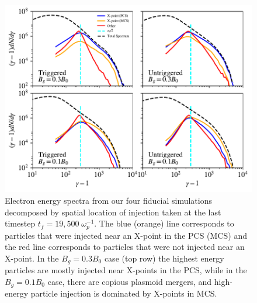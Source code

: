 \begin{figure}[htp]
	\includegraphics[width=\linewidth]{spectra_fourplot.pdf}
	\caption{Electron energy spectra from our four fiducial simulations decomposed by spatial location of injection taken at the last timestep $t_{f}=19,500 \; \omega_{p}^{-1}$.  The blue (orange) line corresponds to particles that were injected near an X-point in the PCS (MCS) and the red line corresponds to particles that were not injected near an X-point.  In the $B_{g}=0.3B_{0}$ case (top row) the highest energy particles are mostly injected near X-points in the PCS, while in the $B_{g}=0.1B_{0}$ case, there are copious plasmoid mergers, and high-energy particle injection is dominated by X-points in MCS.}
	\label{spectra_fourplot}
\end{figure}

